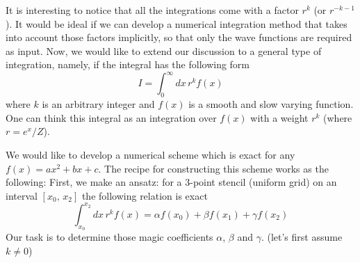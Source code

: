 It is interesting to notice that all the integrations come with a
factor $r^k$ (or $r^{-k-1}$). It would be ideal if we can develop a numerical integration
method that takes into account those factors implicitly, so that only the wave functions
are required as input. Now, we would like to extend our discussion to a
general type of integration, namely, if the integral has the following form
\begin{equation} \label{eq:wInt}
I = \int_0^\infty dx\, r^k f(x)
\end{equation}
where $k$ is an arbitrary integer and $f(x)$ is a smooth and slow varying function.
One can think this integral as an integration over $f(x)$ with a weight $r^k$
(where $r=e^x/Z$).

We would like to develop a numerical scheme which is exact for any
$f(x) = ax^2+bx+c$. The recipe for constructing this scheme works as the following:
First, we make an ansatz: for a 3-point stencil (uniform grid)
on an interval $[x_0,\,x_2]$ the following relation is exact
\begin{equation} \label{eq:intAstz}
\int_{x_0}^{x_2} dx\, r^k f(x) = \alpha f(x_0) + \beta f(x_1) + \gamma f(x_2)
\end{equation}
Our task is to determine those magic coefficients $\alpha$, $\beta$ and $\gamma$.
(let's first assume $k\ne0$)

